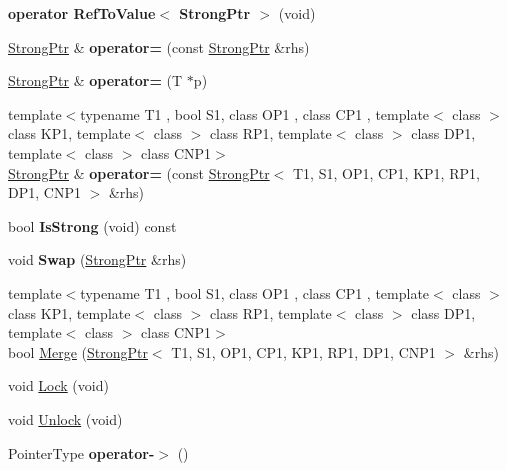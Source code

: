 \begin{DoxyCompactItemize}
\item 
\hypertarget{classLoki_1_1StrongPtr_a478527222fc202ce315d8cf6a96607eb}{}{\bfseries operator Ref\+To\+Value$<$ Strong\+Ptr $>$} (void)\label{classLoki_1_1StrongPtr_a478527222fc202ce315d8cf6a96607eb}

\item 
\hypertarget{classLoki_1_1StrongPtr_a7d5367185bce6ad074b96dc355f60fd2}{}\hyperlink{classLoki_1_1StrongPtr}{Strong\+Ptr} \& {\bfseries operator=} (const \hyperlink{classLoki_1_1StrongPtr}{Strong\+Ptr} \&rhs)\label{classLoki_1_1StrongPtr_a7d5367185bce6ad074b96dc355f60fd2}

\item 
\hypertarget{classLoki_1_1StrongPtr_a1063f2b7ebe40fabac816b2c027b877f}{}\hyperlink{classLoki_1_1StrongPtr}{Strong\+Ptr} \& {\bfseries operator=} (T $\ast$p)\label{classLoki_1_1StrongPtr_a1063f2b7ebe40fabac816b2c027b877f}

\item 
\hypertarget{classLoki_1_1StrongPtr_a9908f27543ed24971c5b94878179b441}{}{\footnotesize template$<$typename T1 , bool S1, class O\+P1 , class C\+P1 , template$<$ class $>$ class K\+P1, template$<$ class $>$ class R\+P1, template$<$ class $>$ class D\+P1, template$<$ class $>$ class C\+N\+P1$>$ }\\\hyperlink{classLoki_1_1StrongPtr}{Strong\+Ptr} \& {\bfseries operator=} (const \hyperlink{classLoki_1_1StrongPtr}{Strong\+Ptr}$<$ T1, S1, O\+P1, C\+P1, K\+P1, R\+P1, D\+P1, C\+N\+P1 $>$ \&rhs)\label{classLoki_1_1StrongPtr_a9908f27543ed24971c5b94878179b441}

\item 
\hypertarget{classLoki_1_1StrongPtr_a601f68cf5918d3454ba8f6362824636f}{}bool {\bfseries Is\+Strong} (void) const \label{classLoki_1_1StrongPtr_a601f68cf5918d3454ba8f6362824636f}

\item 
\hypertarget{classLoki_1_1StrongPtr_aecf5cd5dd4b0b62aa36ff97bbbce4964}{}void {\bfseries Swap} (\hyperlink{classLoki_1_1StrongPtr}{Strong\+Ptr} \&rhs)\label{classLoki_1_1StrongPtr_aecf5cd5dd4b0b62aa36ff97bbbce4964}

\item 
{\footnotesize template$<$typename T1 , bool S1, class O\+P1 , class C\+P1 , template$<$ class $>$ class K\+P1, template$<$ class $>$ class R\+P1, template$<$ class $>$ class D\+P1, template$<$ class $>$ class C\+N\+P1$>$ }\\bool \hyperlink{classLoki_1_1StrongPtr_a15da6878ef32c0ca9559c01a07f3defa}{Merge} (\hyperlink{classLoki_1_1StrongPtr}{Strong\+Ptr}$<$ T1, S1, O\+P1, C\+P1, K\+P1, R\+P1, D\+P1, C\+N\+P1 $>$ \&rhs)
\item 
void \hyperlink{classLoki_1_1StrongPtr_a70ad60678f72611567acc26fc718fed6}{Lock} (void)
\item 
void \hyperlink{classLoki_1_1StrongPtr_ac3afffc8a90f5369c895a220bcc6db34}{Unlock} (void)
\item 
\hypertarget{classLoki_1_1StrongPtr_ad4bcfa8f9fb885df963ae7e89f66eea7}{}Pointer\+Type {\bfseries operator-\/$>$} ()\label{classLoki_1_1StrongPtr_ad4bcfa8f9fb885df963ae7e89f66eea7}


\end{DoxyCompactItemize}
